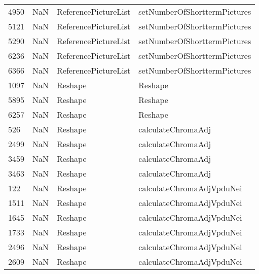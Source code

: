 \begin{tabular}{llll}
4950 &                   NaN &       ReferencePictureList &              setNumberOfShorttermPictures \\
5121 &                   NaN &       ReferencePictureList &              setNumberOfShorttermPictures \\
5290 &                   NaN &       ReferencePictureList &              setNumberOfShorttermPictures \\
6236 &                   NaN &       ReferencePictureList &              setNumberOfShorttermPictures \\
6366 &                   NaN &       ReferencePictureList &              setNumberOfShorttermPictures \\
1097 &                   NaN &                    Reshape &                                   Reshape \\
5895 &                   NaN &                    Reshape &                                   Reshape \\
6257 &                   NaN &                    Reshape &                                   Reshape \\
526  &                   NaN &                    Reshape &                        calculateChromaAdj \\
2499 &                   NaN &                    Reshape &                        calculateChromaAdj \\
3459 &                   NaN &                    Reshape &                        calculateChromaAdj \\
3463 &                   NaN &                    Reshape &                        calculateChromaAdj \\
122  &                   NaN &                    Reshape &                 calculateChromaAdjVpduNei \\
1511 &                   NaN &                    Reshape &                 calculateChromaAdjVpduNei \\
1645 &                   NaN &                    Reshape &                 calculateChromaAdjVpduNei \\
1733 &                   NaN &                    Reshape &                 calculateChromaAdjVpduNei \\
2496 &                   NaN &                    Reshape &                 calculateChromaAdjVpduNei \\
2609 &                   NaN &                    Reshape &                 calculateChromaAdjVpduNei \\

\end{tabular}
